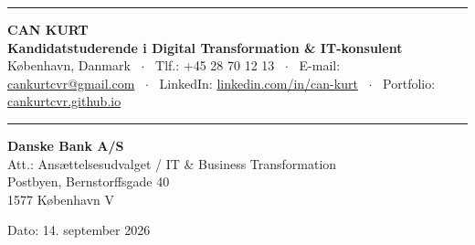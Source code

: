 \documentclass[10pt,a4paper]{article}
\begin{document}
{\color{dbnavy}\rule{\linewidth}{3pt}}\vspace{6pt}

{\fontsize{20}{24}\selectfont \textbf{\color{dbnavy}CAN KURT}} \\[3pt]
{\fontsize{10}{13}\selectfont \textbf{\color{darkslate}Kandidatstuderende i Digital Transformation \& IT-konsulent}} \\[3pt]
{\fontsize{8.5}{12}\selectfont \color{mutedgray}
København, Danmark \ $\cdot$ \ 
Tlf.: +45 28 70 12 13 \ $\cdot$ \ 
E-mail: \href{mailto:cankurtcvr@gmail.com}{cankurtcvr@gmail.com} \ $\cdot$ \ 
LinkedIn: \href{https://linkedin.com/in/can-kurt}{linkedin.com/in/can-kurt} \ $\cdot$ \ 
Portfolio: \href{https://cankurtcvr.github.io}{cankurtcvr.github.io}
}

\vspace{4pt}
{\color{bordergray}\rule{\linewidth}{0.8pt}}
\vspace{12pt}

\begin{minipage}[t]{0.65\textwidth}
    \textbf{\color{darkslate}Danske Bank A/S} \\
    Att.: Ansættelsesudvalget / IT \& Business Transformation \\
    Postbyen, Bernstorffsgade 40 \\
    1577 København V
\end{minipage}
\hfill
\begin{minipage}[t]{0.30\textwidth}
    \raggedleft
    \color{mutedgray}\fontsize{9}{12}\selectfont
    Dato: 14. september 2026
\end{minipage}

\vspace{16pt}

\colorbox{lightbox}{%
    \parbox{\dimexpr\linewidth-2\fboxsep}{%
        \vspace{4pt}
        \hspace{6pt}{\color{dbnavy}\rule{3pt}{13pt}}\hspace{6pt}%
        \vspace{4pt}
    }%
}
\end{document}
